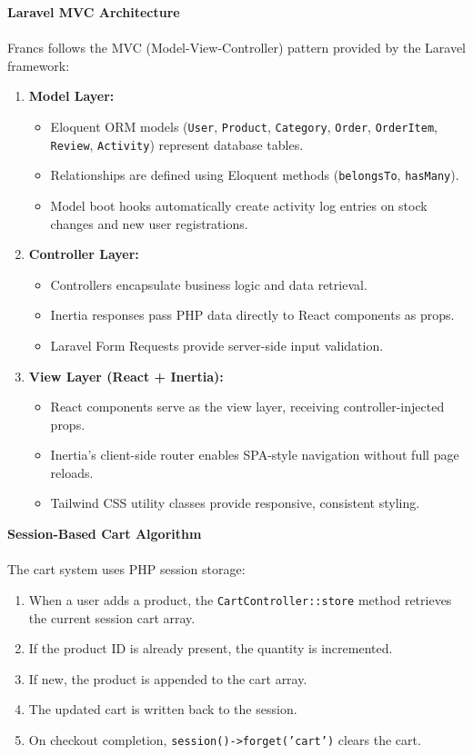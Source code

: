 {\large \textbf{Laravel MVC Architecture}}\\\\
Francs follows the MVC (Model-View-Controller) pattern provided by the Laravel framework:
\begin{enumerate}
    \item \textbf{Model Layer:}
    \begin{itemize}
        \item Eloquent ORM models (\texttt{User}, \texttt{Product}, \texttt{Category}, \texttt{Order}, \texttt{OrderItem}, \texttt{Review}, \texttt{Activity}) represent database tables.
        \item Relationships are defined using Eloquent methods (\texttt{belongsTo}, \texttt{hasMany}).
        \item Model boot hooks automatically create activity log entries on stock changes and new user registrations.
    \end{itemize}
    \item \textbf{Controller Layer:}
    \begin{itemize}
        \item Controllers encapsulate business logic and data retrieval.
        \item Inertia responses pass PHP data directly to React components as props.
        \item Laravel Form Requests provide server-side input validation.
    \end{itemize}
    \item \textbf{View Layer (React + Inertia):}
    \begin{itemize}
        \item React components serve as the view layer, receiving controller-injected props.
        \item Inertia's client-side router enables SPA-style navigation without full page reloads.
        \item Tailwind CSS utility classes provide responsive, consistent styling.
    \end{itemize}
\end{enumerate}

{\large \textbf{Session-Based Cart Algorithm}}\\\\
The cart system uses PHP session storage:
\begin{enumerate}
    \item When a user adds a product, the \texttt{CartController::store} method retrieves the current session cart array.
    \item If the product ID is already present, the quantity is incremented.
    \item If new, the product is appended to the cart array.
    \item The updated cart is written back to the session.
    \item On checkout completion, \texttt{session()->forget('cart')} clears the cart.
\end{enumerate}

